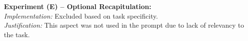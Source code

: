 \documentclass[sigconf]{acmart}
\begin{document}
    \textbf{Experiment (E) -- Optional Recapitulation:} \\
    \textit{Implementation:} Excluded based on task specificity. \\
    \textit{Justification:} This aspect was not used in the prompt due to lack of relevancy to the task.
\end{document}
